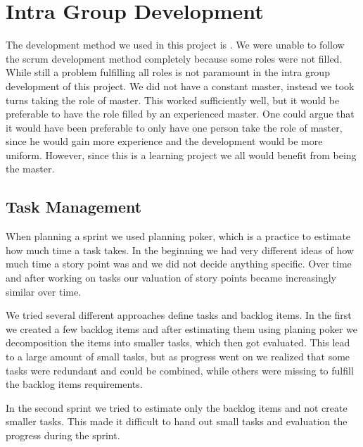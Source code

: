 \section{Intra Group Development}
\label{sec:intragroupdev}
The development method we used in this project is \scrum{}.
We were unable to follow the scrum development method completely because some roles were not filled.
While still a problem fulfilling all roles is not paramount in the intra group development of this project.
We did not have a constant \scrum{} master, instead we took turns taking the role of \scrum{} master.
This worked sufficiently well, but it would be preferable to have the role filled by an experienced \scrum{} master.
One could argue that it would have been preferable to only have one person take the role of \scrum{} master, since he would gain more experience and the development would be more uniform.
However, since this is a learning project we all would benefit from being the \scrum{} master.


\subsection{Task Management}
When planning a sprint we used planning poker, which is a \scrum{} practice to estimate how much time a task takes. 
In the beginning we had very different ideas of how much time a story point was and we did not decide anything specific. 
Over time and after working on tasks our valuation of story points became increasingly similar over time.

We tried several different approaches define tasks and backlog items. 
In the first we created a few backlog items and after estimating them using planing poker we decomposition the items into smaller tasks, which then got evaluated. 
This lead to a large amount of small tasks, but as progress went on we realized that some tasks were redundant and could be combined, while others were missing to fulfill the backlog items requirements. 

In the second sprint we tried to estimate only the backlog items and not create smaller tasks. 
This made it difficult to hand out small tasks and evaluation the progress during the sprint. 

